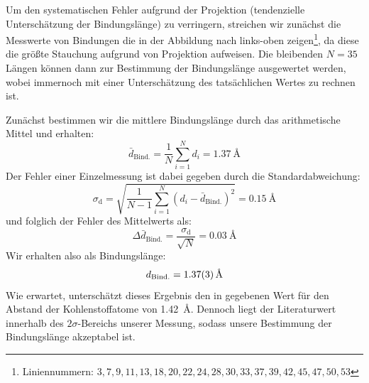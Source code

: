 \documentclass[10pt, a4paper]{article}
\begin{document}
Um den systematischen Fehler aufgrund der Projektion (tendenzielle Unterschätzung der Bindungslänge) zu verringern, streichen wir zunächst die Messwerte von Bindungen die in der Abbildung nach links-oben zeigen\footnote{Liniennummern: $3,7,9,11,13,18,20,22,24,28,30,33,37,39,42,45,47,50,53$}, da diese die größte Stauchung aufgrund von Projektion aufweisen.
Die bleibenden $N = \num{35}$ Längen können dann zur Bestimmung der Bindungslänge ausgewertet werden, wobei immernoch mit einer Unterschätzung des tatsächlichen Wertes zu rechnen ist.

Zunächst bestimmen wir die mittlere Bindungslänge durch das arithmetische Mittel und erhalten:
\begin{equation}
  \bar{d}_\mathrm{Bind.} = \frac{1}{N} \sum_{i=1}^N d_i= \SI{1,37}{\angstrom}
\end{equation}
Der Fehler einer Einzelmessung ist dabei gegeben durch die Standardabweichung:
\begin{equation}
  \sigma_\mathrm{d} = \sqrt{\frac{1}{N-1} \sum_{i=1}^N (d_i - \bar{d}_\mathrm{Bind.})^2} = \SI{0,15}{\angstrom}
\end{equation}
und folglich der Fehler des Mittelwerts als:
\begin{equation}
  \Delta \bar{d}_\mathrm{Bind.} = \frac{\sigma_\mathrm{d}}{\sqrt{N}} = \SI{0,03}{\angstrom}
\end{equation}
Wir erhalten also als Bindungslänge:
\begin{equation}
  d_\mathrm{Bind.} = \SI{1,37 +- 0,03}{\angstrom}
\end{equation}
Wie erwartet, unterschätzt dieses Ergebnis den in \cite{colton} gegebenen Wert für den Abstand der Kohlenstoffatome von \SI{1,42}{\angstrom}. Dennoch liegt der Literaturwert innerhalb des $2\sigma$-Bereichs unserer Messung, sodass unsere Bestimmung der Bindungslänge akzeptabel ist.
\end{document}
